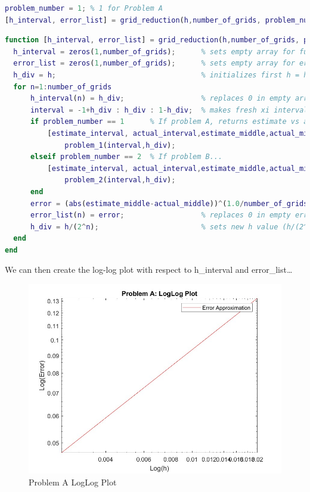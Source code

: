 \documentclass[10pt,letterpaper]{article}
\begin{document}
\begin{enumerate}[a)]
     \begin{lstlisting}[language = Matlab]
problem_number = 1; % 1 for Problem A
[h_interval, error_list] = grid_reduction(h,number_of_grids, problem_number);
    \end{lstlisting}
     \begin{lstlisting}[language = Matlab]
function [h_interval, error_list] = grid_reduction(h,number_of_grids, problem_number)
  h_interval = zeros(1,number_of_grids);      % sets empty array for future h/# values
  error_list = zeros(1,number_of_grids);      % sets empty array for error approximations
  h_div = h;                                  % initializes first h = h
  for n=1:number_of_grids
      h_interval(n) = h_div;                  % replaces 0 in empty array with actual h/# value
      interval = -1+h_div : h_div : 1-h_div;  % makes fresh xi interval with h/# as gap
      if problem_number == 1      % If problem A, returns estimate vs actual for each xi based on h/# gap AND estimate and actual middle value for loglog graph
          [estimate_interval, actual_interval,estimate_middle,actual_middle] = ...
              problem_1(interval,h_div);
      elseif problem_number == 2  % If problem B...
          [estimate_interval, actual_interval,estimate_middle,actual_middle] = ...
              problem_2(interval,h_div);
      end
      error = (abs(estimate_middle-actual_middle))^(1.0/number_of_grids); % error approximation
      error_list(n) = error;                  % replaces 0 in empty error_list array with error approximation
      h_div = h/(2^n);                        % sets new h value (h/(2^grid_size))
  end
end
\end{lstlisting}
    
\pagebreak
    We can then create the log-log plot with respect to h\_interval and error\_list\ldots
    \begin{figure}[h!]
      \centering
      \includegraphics[width=1\linewidth]{problem_a_loglog_plot.jpg}
      \caption{Problem A\: LogLog Plot}\label{fig:problem_a_loglog_plot}
    \end{figure}


\end{enumerate}
\end{document}
